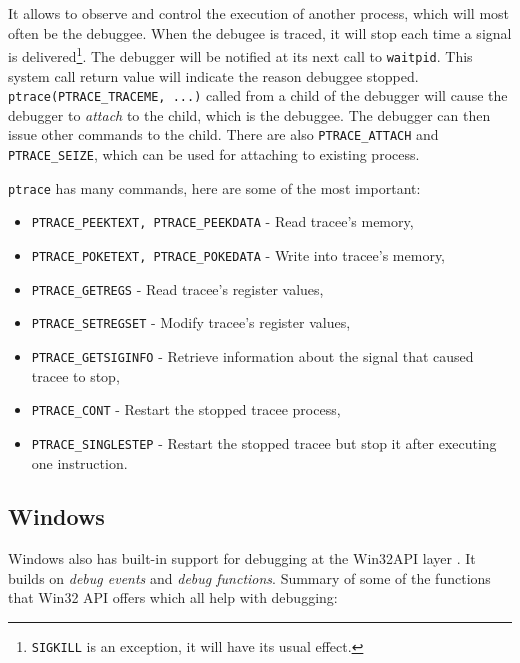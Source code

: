 It allows to observe and control the execution of another process, which will most often be the debuggee. When the debugee is traced, it will stop each time a signal is delivered\footnote{\lstinline{SIGKILL} is an exception, it will have its usual effect.}. The debugger will be notified at its next call to \lstinline{waitpid}. This system call return value will indicate the reason debuggee stopped. \lstinline{ptrace(PTRACE_TRACEME, ...)} called from a child of the debugger will cause the debugger to \textit{attach} to the child, which is the debuggee. The debugger can then issue other commands to the child. There are also \lstinline{PTRACE_ATTACH} and \lstinline{PTRACE_SEIZE}, which can be used for attaching to existing process.

\lstinline{ptrace} has many commands, here are some of the most important:
\begin{itemize}
    \item \lstinline{PTRACE_PEEKTEXT, PTRACE_PEEKDATA} - Read tracee's memory,
    \item \lstinline{PTRACE_POKETEXT, PTRACE_POKEDATA} - Write into tracee's memory,
    \item \lstinline{PTRACE_GETREGS} - Read tracee's register values,
    \item \lstinline{PTRACE_SETREGSET} - Modify tracee's register values,
    \item \lstinline{PTRACE_GETSIGINFO} - Retrieve information about the signal that caused tracee to stop,
    \item \lstinline{PTRACE_CONT} - Restart the stopped tracee process,
    \item \lstinline{PTRACE_SINGLESTEP} - Restart the stopped tracee but stop it after executing one instruction.
\end{itemize}


\subsection{Windows}
Windows also has built-in support for debugging at the Win32API layer \cite{windows-msdn-debugging-api, windows-press-debugging-api}.
It builds on \textit{debug events} and \textit{debug functions}. Summary of some of the functions that Win32 API offers which all help with debugging:

